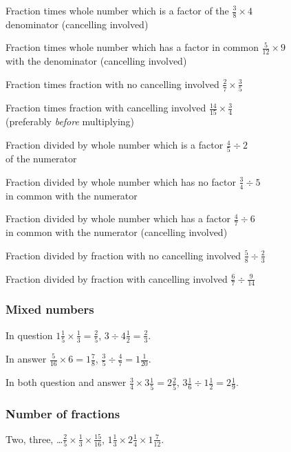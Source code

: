 \documentclass{article}
\begin{document}
Fraction times whole number which is a factor of the \hfill \(\frac{3}{8} \times 4\) \\
denominator (cancelling involved)

Fraction times whole number which has a factor in common \hfill  \(\frac{5}{12} \times 9\) \\
with the denominator (cancelling involved)

Fraction times fraction with no cancelling involved \hfill \(\frac{2}{7} \times \frac{3}{5}\)

Fraction times fraction with cancelling involved \hfill \(\frac{14}{15} \times \frac{3}{4}\) \\
(preferably \textit{before} multiplying)

Fraction divided by whole number which is a factor \hfill \(\frac{4}{5} \div 2\) \\
of the numerator

Fraction divided by whole number which has no factor \hfill \(\frac{3}{4} \div 5\) \\
in common with the numerator

Fraction divided by whole number which has a factor \hfill \(\frac{4}{7} \div 6\) \\
in common with the numerator (cancelling involved)

Fraction divided by fraction with no cancelling involved \hfill \(\frac{5}{8} \div \frac{2}{3}\)

Fraction divided by fraction with cancelling involved \hfill \(\frac{6}{7} \div \frac{9}{14}\)

\subsubsection{Mixed numbers}

In question \hfill \(1\frac{1}{5} \times \frac{1}{3} = \frac{2}{5}\), \(3 \div 4\frac{1}{2} = \frac{2}{3}\).

In answer \hfill \(\frac{5}{16} \times 6 = 1\frac{7}{8}\), \(\frac{3}{5} \div \frac{4}{7} = 1\frac{1}{20}\).

In both question and answer \hfill \(\frac{3}{4} \times 3\frac{1}{5} = 2\frac{2}{5}\), \(3\frac{1}{6} \div 1\frac{1}{2} = 2\frac{1}{9}\).

\subsubsection{Number of fractions}

Two, three, \ldots \hfill \(\frac{2}{5} \times \frac{1}{3} \times \frac{15}{16}\), \(1\frac{1}{3} \times 2\frac{1}{4} \times 1\frac{7}{12}\).
\end{document}
